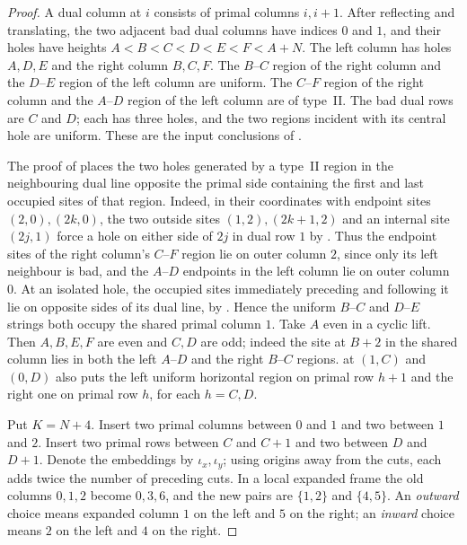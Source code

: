 \documentclass[11pt,colorlinks]{charlie}
\begin{document}
\begin{proof}
A dual column at $i$ consists of primal columns $i,i+1$. After reflecting and translating, the two adjacent bad dual columns have indices $0$ and $1$, and their holes have heights $A<B<C<D<E<F<A+N$. The left column has holes $A,D,E$ and the right column $B,C,F$. The $B$--$C$ region of the right column and the $D$--$E$ region of the left column are uniform. The $C$--$F$ region of the right column and the $A$--$D$ region of the left column are of type~II. The bad dual rows are $C$ and $D$; each has three holes, and the two regions incident with its central hole are uniform. These are the input conclusions of \cite[Section~3.2.2, Case~2]{BHNlong}.

The proof of \cite[Lemma~19]{BHNlong} places the two holes generated by a type~II region in the neighbouring dual line opposite the primal side containing the first and last occupied sites of that region. Indeed, in their coordinates with endpoint sites $(2,0),(2k,0)$, the two outside sites $(1,2),(2k+1,2)$ and an internal site $(2j,1)$ force a hole on either side of $2j$ in dual row $1$ by \cite[Lemma~12]{BHNlong}. Thus the endpoint sites of the right column's $C$--$F$ region lie on outer column $2$, since only its left neighbour is bad, and the $A$--$D$ endpoints in the left column lie on outer column $0$. At an isolated hole, the occupied sites immediately preceding and following it lie on opposite sides of its dual line, by \cite[Lemma~16]{BHNlong}. Hence the uniform $B$--$C$ and $D$--$E$ strings both occupy the shared primal column $1$. Take $A$ even in a cyclic lift. Then $A,B,E,F$ are even and $C,D$ are odd; indeed the site at $B+2$ in the shared column lies in both the left $A$--$D$ and the right $B$--$C$ regions. \cite[Lemma~16]{BHNlong} at $(1,C)$ and $(0,D)$ also puts the left uniform horizontal region on primal row $h+1$ and the right one on primal row $h$, for each $h=C,D$.

Put $K=N+4$. Insert two primal columns between $0$ and $1$ and two between $1$ and $2$. Insert two primal rows between $C$ and $C+1$ and two between $D$ and $D+1$. Denote the embeddings by $\iota_x,\iota_y$; using origins away from the cuts, each adds twice the number of preceding cuts. In a local expanded frame the old columns $0,1,2$ become $0,3,6$, and the new pairs are $\{1,2\}$ and $\{4,5\}$. An \emph{outward} choice means expanded column $1$ on the left and $5$ on the right; an \emph{inward} choice means $2$ on the left and $4$ on the right.


\end{proof}
\end{document}
